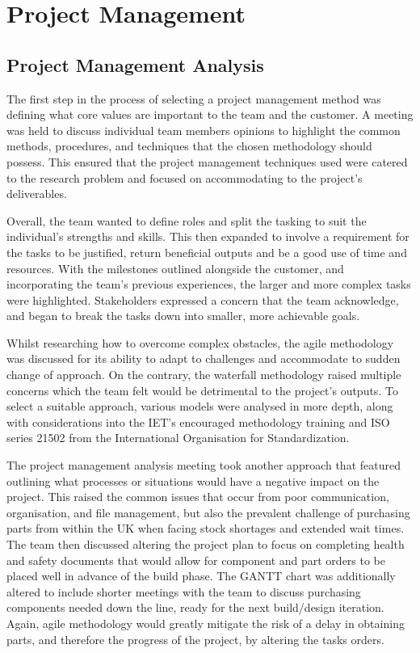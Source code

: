 \documentclass [12pt]{article}
\begin{document}
\section{Project Management}\label{sec:project_management}

\subsection{Project Management Analysis}\label{sec:project_management_analysis}
The first step in the process of selecting a project management method was defining what core values are important to the team and the customer. A meeting was held to discuss individual team members opinions to highlight the common methods, procedures, and techniques that the chosen methodology should possess. This ensured that the project management techniques used were catered to the research problem and focused on accommodating to the project’s deliverables.

Overall, the team wanted to define roles and split the tasking to suit the individual’s strengths and skills. This then expanded to involve a requirement for the tasks to be justified, return beneficial outputs and be a good use of time and resources. With the milestones outlined alongside the customer, and incorporating the team’s previous experiences, the larger and more complex tasks were highlighted. Stakeholders expressed a concern that the team acknowledge, and began to break the tasks down into smaller, more achievable goals.

Whilst researching how to overcome complex obstacles, the agile methodology was discussed for its ability to adapt to challenges and accommodate to sudden change of approach. On the contrary, the waterfall methodology raised multiple concerns which the team felt would be detrimental to the project’s outputs. To select a suitable approach, various models were analysed in more depth, along with considerations into the IET’s encouraged methodology training and ISO series 21502 from the International Organisation for Standardization.

The project management analysis meeting took another approach that featured outlining what processes or situations would have a negative impact on the project. This raised the common issues that occur from poor communication, organisation, and file management, but also the prevalent challenge of purchasing parts from within the UK when facing stock shortages and extended wait times. The team then discussed altering the project plan to focus on completing health and safety documents that would allow for component and part orders to be placed well in advance of the build phase. The GANTT chart was additionally altered to include shorter meetings with the team to discuss purchasing components needed down the line, ready for the next build/design iteration. Again, agile methodology would greatly mitigate the risk of a delay in obtaining parts, and therefore the progress of the project, by altering the tasks orders.
\end{document}
